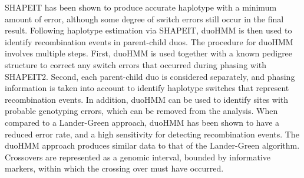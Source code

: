 SHAPEIT has been shown to produce accurate haplotype with a minimum amount of error, although some degree of switch errors still occur in the final result.
Following haplotype estimation via SHAPEIT, duoHMM\cite{OConnell2014} is then used to identify recombination events in parent-child duos.
The procedure for duoHMM involves multiple steps.
First, duoHMM is used together with a known pedigree structure to correct any switch errors that occurred during phasing with SHAPEIT2.
Second, each parent-child duo is considered separately, and phasing information is taken into account to identify haplotype switches that represent recombination events.
In addition, duoHMM can be used to identify sites with probable genotyping errors, which can be removed from the analysis.
When compared to a Lander-Green approach, duoHMM has been shown to have a reduced error rate, and a high sensitivity for detecting recombination events\cite{OConnell2014}.
The duoHMM approach produces similar data to that of the Lander-Green algorithm.
Crossovers are represented as a genomic interval, bounded by informative markers, within which the crossing over must have occurred.









\clearpage
\renewcommand{\bibname}{References}
\begingroup
    \setlength{\bibsep}{10pt}
    \linespread{1}\selectfont
    
\endgroup

